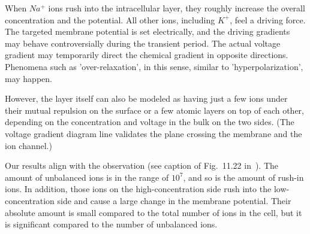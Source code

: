 When $Na^+$ ions rush into the intracellular layer, they roughly increase the overall concentration and the potential. All other ions, including $K^+$,  feel a driving force. The targeted membrane potential is set electrically, and the driving gradients may behave controversially during the transient period. The actual voltage gradient may temporarily direct the chemical gradient in opposite directions.
Phenomena such as 'over-relaxation', in this sense, similar to 'hyperpolarization', may happen.


However, the layer itself can also be modeled
as having just a few ions under their mutual repulsion on the surface
or a few atomic layers on top of each other, depending on the concentration
and voltage in the bulk on the two sides. (The voltage gradient diagram line validates
the plane crossing the membrane and the ion channel.) 


Our results align with the observation (see caption of Fig.~11.22 in~\cite{MolecularBiology:2002}).
The amount of unbalanced ions is in the range of $10^7$,
and so is the amount of rush-in ions. In addition, those 
ions on the high-concentration side rush into the 
low-concentration side and cause a large change in the 
membrane potential. Their absolute amount is small compared to the total number of ions in the cell,
but it is significant compared to the number of unbalanced ions.




